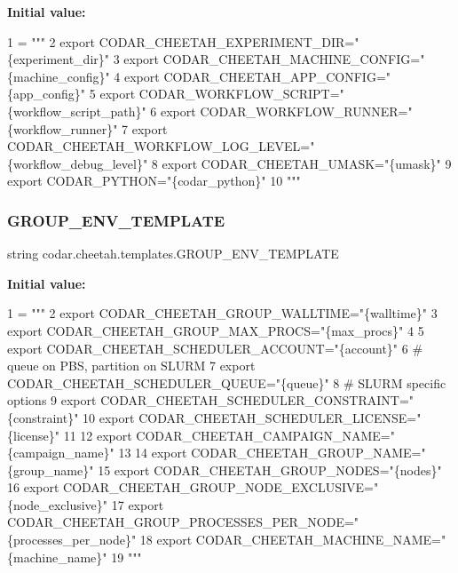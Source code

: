 {\bfseries Initial value\+:}
\begin{DoxyCode}
1 =  \textcolor{stringliteral}{"""}
2 \textcolor{stringliteral}{export CODAR\_CHEETAH\_EXPERIMENT\_DIR="\{experiment\_dir\}"}
3 \textcolor{stringliteral}{export CODAR\_CHEETAH\_MACHINE\_CONFIG="\{machine\_config\}"}
4 \textcolor{stringliteral}{export CODAR\_CHEETAH\_APP\_CONFIG="\{app\_config\}"}
5 \textcolor{stringliteral}{export CODAR\_WORKFLOW\_SCRIPT="\{workflow\_script\_path\}"}
6 \textcolor{stringliteral}{export CODAR\_WORKFLOW\_RUNNER="\{workflow\_runner\}"}
7 \textcolor{stringliteral}{export CODAR\_CHEETAH\_WORKFLOW\_LOG\_LEVEL="\{workflow\_debug\_level\}"}
8 \textcolor{stringliteral}{export CODAR\_CHEETAH\_UMASK="\{umask\}"}
9 \textcolor{stringliteral}{export CODAR\_PYTHON="\{codar\_python\}"}
10 \textcolor{stringliteral}{"""}
\end{DoxyCode}
\mbox{\label{namespacecodar_1_1cheetah_1_1templates_a5f3128e651f6b9b80eb8c492b2f3edd1}} 
\subsubsection{\texorpdfstring{G\+R\+O\+U\+P\+\_\+\+E\+N\+V\+\_\+\+T\+E\+M\+P\+L\+A\+TE}{GROUP\_ENV\_TEMPLATE}}
{\footnotesize\ttfamily string codar.\+cheetah.\+templates.\+G\+R\+O\+U\+P\+\_\+\+E\+N\+V\+\_\+\+T\+E\+M\+P\+L\+A\+TE}

{\bfseries Initial value\+:}
\begin{DoxyCode}
1 =  \textcolor{stringliteral}{"""}
2 \textcolor{stringliteral}{export CODAR\_CHEETAH\_GROUP\_WALLTIME="\{walltime\}"}
3 \textcolor{stringliteral}{export CODAR\_CHEETAH\_GROUP\_MAX\_PROCS="\{max\_procs\}"}
4 \textcolor{stringliteral}{}
5 \textcolor{stringliteral}{export CODAR\_CHEETAH\_SCHEDULER\_ACCOUNT="\{account\}"}
6 \textcolor{stringliteral}{# queue on PBS, partition on SLURM}
7 \textcolor{stringliteral}{export CODAR\_CHEETAH\_SCHEDULER\_QUEUE="\{queue\}"}
8 \textcolor{stringliteral}{# SLURM specific options}
9 \textcolor{stringliteral}{export CODAR\_CHEETAH\_SCHEDULER\_CONSTRAINT="\{constraint\}"}
10 \textcolor{stringliteral}{export CODAR\_CHEETAH\_SCHEDULER\_LICENSE="\{license\}"}
11 \textcolor{stringliteral}{}
12 \textcolor{stringliteral}{export CODAR\_CHEETAH\_CAMPAIGN\_NAME="\{campaign\_name\}"}
13 \textcolor{stringliteral}{}
14 \textcolor{stringliteral}{export CODAR\_CHEETAH\_GROUP\_NAME="\{group\_name\}"}
15 \textcolor{stringliteral}{export CODAR\_CHEETAH\_GROUP\_NODES="\{nodes\}"}
16 \textcolor{stringliteral}{export CODAR\_CHEETAH\_GROUP\_NODE\_EXCLUSIVE="\{node\_exclusive\}"}
17 \textcolor{stringliteral}{export CODAR\_CHEETAH\_GROUP\_PROCESSES\_PER\_NODE="\{processes\_per\_node\}"}
18 \textcolor{stringliteral}{export CODAR\_CHEETAH\_MACHINE\_NAME="\{machine\_name\}"}
19 \textcolor{stringliteral}{"""}
\end{DoxyCode}
